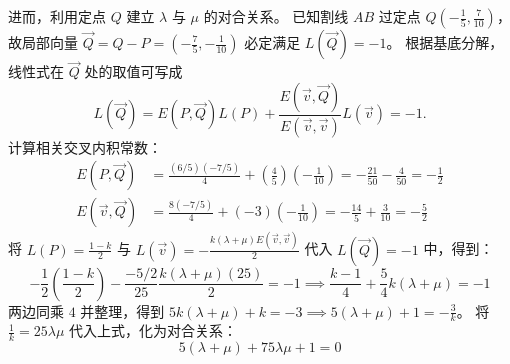 \begin{solution}
进而，利用定点 $Q$ 建立 $\lambda$ 与 $\mu$ 的对合关系。
已知割线 $AB$ 过定点 $Q\left(-\frac{1}{5}, \frac{7}{10}\right)$，故局部向量 $\vec{Q} = Q - P = \left(-\frac{7}{5}, -\frac{1}{10}\right)$ 必定满足 $L(\vec{Q}) = -1$。
根据基底分解，线性式在 $\vec{Q}$ 处的取值可写成
$$L(\vec{Q}) = E(P, \vec{Q}) L(P) + \frac{E(\vec{v}, \vec{Q})}{E(\vec{v}, \vec{v})} L(\vec{v}) = -1.$$
计算相关交叉内积常数：
\begin{align*}
E(P, \vec{Q}) &= \frac{(6/5)(-7/5)}{4} + \left(\frac{4}{5}\right)\left(-\frac{1}{10}\right) = -\frac{21}{50} - \frac{4}{50} = -\frac{1}{2} \\
E(\vec{v}, \vec{Q}) &= \frac{8(-7/5)}{4} + (-3)\left(-\frac{1}{10}\right) = -\frac{14}{5} + \frac{3}{10} = -\frac{5}{2}
\end{align*}
将 $L(P) = \frac{1-k}{2}$ 与 $L(\vec{v}) = -\frac{k(\lambda+\mu)E(\vec{v}, \vec{v})}{2}$ 代入 $L(\vec{Q}) = -1$ 中，得到：
$$ -\frac{1}{2} \left(\frac{1-k}{2}\right) - \frac{-5/2}{25} \frac{k(\lambda+\mu)(25)}{2} = -1 \implies \frac{k-1}{4} + \frac{5}{4} k(\lambda+\mu) = -1 $$
两边同乘 $4$ 并整理，得到 $5k(\lambda+\mu) + k = -3 \implies 5(\lambda+\mu) + 1 = -\frac{3}{k}$。
将 $\frac{1}{k} = 25\lambda\mu$ 代入上式，化为对合关系：
$$ 5(\lambda+\mu) + 75\lambda\mu + 1 = 0 $$


\end{solution}
